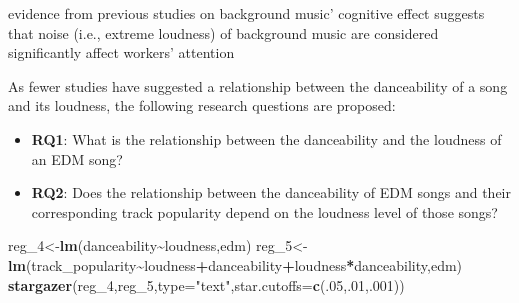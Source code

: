 \documentclass[
]{book}
\newenvironment{Shaded}{\begin{snugshade}}{\end{snugshade}}
\newcommand{\AttributeTok}[1]{\textcolor[rgb]{0.13,0.29,0.53}{#1}}
\newcommand{\DecValTok}[1]{\textcolor[rgb]{0.00,0.00,0.81}{#1}}
\newcommand{\FunctionTok}[1]{\textcolor[rgb]{0.13,0.29,0.53}{\textbf{#1}}}
\newcommand{\NormalTok}[1]{#1}
\newcommand{\OtherTok}[1]{\textcolor[rgb]{0.56,0.35,0.01}{#1}}
\newcommand{\SpecialCharTok}[1]{\textcolor[rgb]{0.81,0.36,0.00}{\textbf{#1}}}
\newcommand{\StringTok}[1]{\textcolor[rgb]{0.31,0.60,0.02}{#1}}
\begin{document}
evidence from previous studies on background music' cognitive effect suggests that noise (i.e., extreme loudness) of background music are considered significantly affect workers' attention \citep[e.g.,][]{shih2012background}

As fewer studies have suggested a relationship between the danceability of a song and its loudness, the following research questions are proposed:

\begin{itemize}
\item
  \textbf{RQ1}: What is the relationship between the danceability and the loudness of an EDM song?
\item
  \textbf{RQ2}: Does the relationship between the danceability of EDM songs and their corresponding track popularity depend on the loudness level of those songs?
\end{itemize}

\begin{Shaded}
\begin{Highlighting}[]
\NormalTok{reg\_4}\OtherTok{\textless{}{-}}\FunctionTok{lm}\NormalTok{(danceability}\SpecialCharTok{\textasciitilde{}}\NormalTok{loudness,edm)}
\NormalTok{reg\_5}\OtherTok{\textless{}{-}}\FunctionTok{lm}\NormalTok{(track\_popularity}\SpecialCharTok{\textasciitilde{}}\NormalTok{loudness}\SpecialCharTok{+}\NormalTok{danceability}\SpecialCharTok{+}\NormalTok{loudness}\SpecialCharTok{*}\NormalTok{danceability,edm)}
\FunctionTok{stargazer}\NormalTok{(reg\_4,reg\_5,}\AttributeTok{type=}\StringTok{"text"}\NormalTok{,}\AttributeTok{star.cutoffs=}\FunctionTok{c}\NormalTok{(.}\DecValTok{05}\NormalTok{,.}\DecValTok{01}\NormalTok{,.}\DecValTok{001}\NormalTok{))}
\end{Highlighting}
\end{Shaded}
\end{document}
